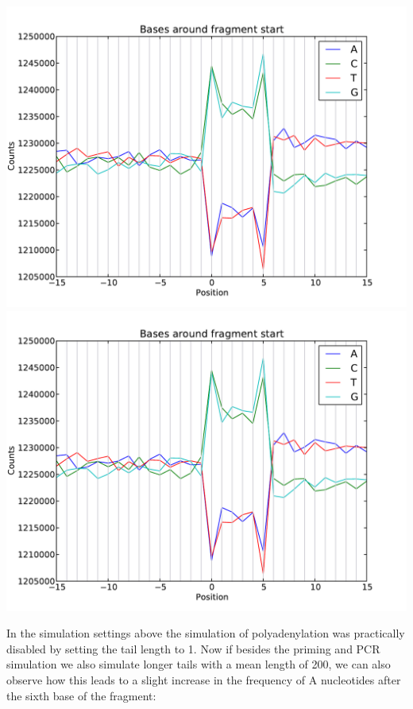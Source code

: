\begin{center}
\includegraphics[scale=0.6,page=1]{../src/test/pos_bias/pb_full.pdf}
\\
\includegraphics[scale=0.6,page=2]{../src/test/pos_bias/pb_full.pdf}
\end{center}

In the simulation settings above the simulation of polyadenylation was practically disabled by setting the tail length to 1.
Now if besides the priming and PCR simulation we also simulate longer tails with a mean length of 200, we can also observe how this leads to a slight increase
in the frequency of A nucleotides after the sixth base of the fragment:

